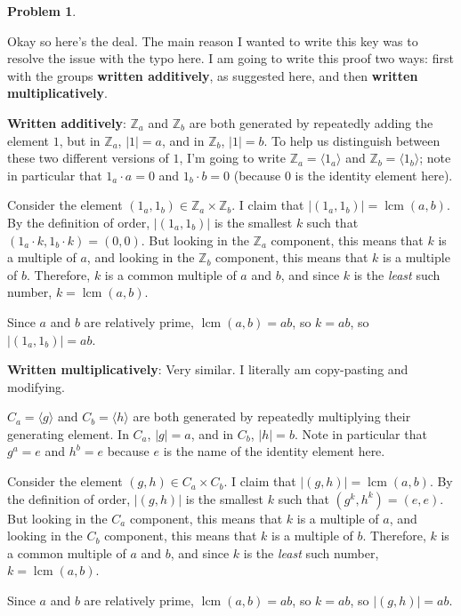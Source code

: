 \documentclass[12pt]{article}
\theoremstyle{definition} %
\newtheorem{problem}{Problem}
\newcommand{\Balert}[1]{\textcolor{xBlue}{#1}}
\newcommand{\Z}{\mathbb{Z}}
\def\<{\langle}
\def\>{\rangle}
\DeclareMathOperator{\lcm}{lcm}
\newenvironment{red}{\color{red}}{\ignorespacesafterend}
\newenvironment{xBlue}{\color{xBlue}}{\ignorespacesafterend}
\begin{document}
\begin{problem}
\begin{enumerate}[(a)]
        \begin{red}
            Okay so here's the deal. The main reason I wanted to write this key was to resolve the issue with the typo here. I am going to write this proof two ways: first with the groups \textbf{written additively}, as suggested here, and then \Balert{\textbf{written multiplicatively}.}

            \textbf{Written additively}: $\Z_a$ and $\Z_b$ are both generated by repeatedly adding the element $1$, but in $\Z_a$, $|1| = a$, and in $\Z_b$, $|1| = b$. To help us distinguish between these two different versions of $1$, I'm going to write $\Z_a = \<1_a\>$ and $\Z_b = \<1_b\>$; note in particular that $1_a \cdot a = 0$ and $1_b \cdot b = 0$ (because 0 is the identity element here).

            Consider the element $(1_a, 1_b) \in \Z_a \times \Z_b$. I claim that $|(1_a, 1_b)| = \lcm(a, b)$. By the definition of order, $|(1_a, 1_b)|$ is the smallest $k$ such that $(1_a\cdot k, 1_b \cdot k) = (0, 0)$. But looking in the $\Z_a$ component, this means that $k$ is a multiple of $a$, and looking in the $\Z_b$ component, this means that $k$ is a multiple of $b$. Therefore, $k$ is a common multiple of $a$ and $b$, and since $k$ is the \textit{least} such number, $k = \lcm(a, b)$.

            Since $a$ and $b$ are relatively prime, $\lcm(a, b) = ab$, so $k = ab$, so $|(1_a, 1_b)| = ab$.
        \end{red}

        \begin{xBlue}
            \textbf{Written multiplicatively}: Very similar. I literally am copy-pasting and modifying.

            $C_a = \<g\>$ and $C_b = \<h\>$ are both generated by repeatedly multiplying their generating element. In $C_a$, $|g| = a$, and in $C_b$, $|h| = b$. Note in particular that $g^a = e$ and $h^b = e$ because $e$ is the name of the identity element here.

            Consider the element $(g, h) \in C_a \times C_b$. I claim that $|(g, h)| = \lcm(a, b)$. By the definition of order, $|(g,h)|$ is the smallest $k$ such that $(g^k, h^k) = (e, e)$. But looking in the $C_a$ component, this means that $k$ is a multiple of $a$, and looking in the $C_b$ component, this means that $k$ is a multiple of $b$. Therefore, $k$ is a common multiple of $a$ and $b$, and since $k$ is the \textit{least} such number, $k = \lcm(a, b)$.

            Since $a$ and $b$ are relatively prime, $\lcm(a, b) = ab$, so $k = ab$, so $|(g, h)| = ab$.
        \end{xBlue}


\end{enumerate}
\end{problem}
\end{document}
